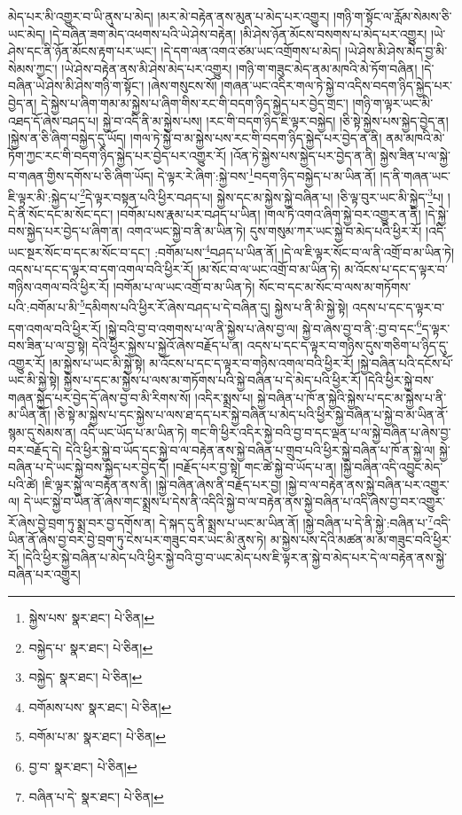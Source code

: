 མེད་པར་མི་འགྱུར་བ་ཡི་ནུས་པ་མེད། །མར་མེ་བརྟེན་ནས་མུན་པ་མེད་པར་འགྱུར། །གཉི་ག་སྟོང་ལ་རློམ་སེམས་ཅི་ཡང་མེད། །དེ་བཞིན་ཟག་མེད་འཕགས་པའི་ཡེ་ཤེས་བརྟེན། །མི་ཤེས་ཉོན་མོངས་བསགས་པ་མེད་པར་འགྱུར། །ཡེ་ཤེས་དང་ནི་ཉོན་མོངས་རྟག་པར་ཡང་། །དེ་དག་ལན་འགའ་ཙམ་ཡང་འགྲོགས་པ་མེད། །ཡེ་ཤེས་མི་ཤེས་མེད་བྱ་མི་སེམས་ཀྱང་། །ཡེ་ཤེས་བརྟེན་ནས་མི་ཤེས་མེད་པར་འགྱུར། །གཉི་ག་གཟུང་མེད་ནམ་མཁའི་མེ་ཏོག་བཞིན། །དེ་བཞིན་ཡེ་ཤེས་མི་ཤེས་གཉི་ག་སྟོང་། །ཞེས་གསུངས་སོ། །གཞན་ཡང་འདིར་གལ་ཏེ་སྐྱེ་བ་འདིས་བདག་ཉིད་སྐྱེད་པར་བྱེད་ན། དེ་སྐྱེས་པ་ཞིག་གམ་མ་སྐྱེས་པ་ཞིག་གིས་རང་གི་བདག་ཉིད་སྐྱེད་པར་བྱེད་གྲང་། །གཉི་ག་ལྟར་ཡང་མི་འཐད་དོ་ཞེས་བཤད་པ། སྐྱེ་བ་འདི་ནི་མ་སྐྱེས་པས། །རང་གི་བདག་ཉིད་ཇི་ལྟར་བསྐྱེད། །ཅི་སྟེ་སྐྱེས་པས་སྐྱེད་བྱེད་ན། །སྐྱེས་ན་ཅི་ཞིག་བསྐྱེད་དུ་ཡོད། །གལ་ཏེ་སྐྱེ་བ་མ་སྐྱེས་པས་རང་གི་བདག་ཉིད་སྐྱེད་པར་བྱེད་ན་ནི། ནམ་མཁའི་མེ་ཏོག་ཀྱང་རང་གི་བདག་ཉིད་སྐྱེད་པར་བྱེད་པར་འགྱུར་རོ། །འོན་ཏེ་སྐྱེས་པས་སྐྱེད་པར་བྱེད་ན་ནི། སྐྱེས་ཟིན་པ་ལ་སྐྱེ་བ་གཞན་གྱིས་དགོས་པ་ཅི་ཞིག་ཡོད། དེ་ལྟར་རེ་ཞིག་:སྐྱེ་བས་\footnote{སྐྱེས་པས་  སྣར་ཐང་།  པེ་ཅིན། }བདག་ཉིད་བསྐྱེད་པ་མ་ཡིན་ནོ། །ད་ནི་གཞན་ཡང་ཇི་ལྟར་མི་:སྐྱེད་པ་\footnote{བསྐྱེད་པ་  སྣར་ཐང་།  པེ་ཅིན། }དེ་ལྟར་བསྟན་པའི་ཕྱིར་བཤད་པ། སྐྱེས་དང་མ་སྐྱེས་སྐྱེ་བཞིན་པ། །ཅི་ལྟ་བུར་ཡང་མི་སྐྱེད་\footnote{བསྐྱེད་  སྣར་ཐང་།  པེ་ཅིན། }པ། །དེ་ནི་སོང་དང་མ་སོང་དང་། །བགོམ་པས་རྣམ་པར་བཤད་པ་ཡིན། །གལ་ཏེ་འགའ་ཞིག་སྐྱེ་བར་འགྱུར་ན་ནི། །དེ་སྐྱེ་བས་སྐྱེད་པར་བྱེད་པ་ཞིག་ན། འགའ་ཡང་སྐྱེ་བ་ནི་མ་ཡིན་ཏེ། དུས་གསུམ་ཀར་ཡང་སྐྱེ་བ་མེད་པའི་ཕྱིར་རོ། །འདི་ཡང་སྔར་སོང་བ་དང་མ་སོང་བ་དང་། :བགོམ་པས་\footnote{བགོམས་པས་  སྣར་ཐང་།  པེ་ཅིན། }བཤད་པ་ཡིན་ནོ། །དེ་ལ་ཇི་ལྟར་སོང་བ་ལ་ནི་འགྲོ་བ་མ་ཡིན་ཏེ། འདས་པ་དང་ད་ལྟར་བ་དག་འགལ་བའི་ཕྱིར་རོ། །མ་སོང་བ་ལ་ཡང་འགྲོ་བ་མ་ཡིན་ཏེ། མ་འོངས་པ་དང་ད་ལྟར་བ་གཉིས་འགལ་བའི་ཕྱིར་རོ། །བགོམ་པ་ལ་ཡང་འགྲོ་བ་མ་ཡིན་ཏེ། སོང་བ་དང་མ་སོང་བ་ལས་མ་གཏོགས་པའི་:བགོམ་པ་མི་\footnote{བགོམ་པ་མ་  སྣར་ཐང་།  པེ་ཅིན། }དམིགས་པའི་ཕྱིར་རོ་ཞེས་བཤད་པ་དེ་བཞིན་དུ། སྐྱེས་པ་ནི་མི་སྐྱེ་སྟེ། འདས་པ་དང་ད་ལྟར་བ་དག་འགལ་བའི་ཕྱིར་རོ། །སྐྱེ་བའི་བྱ་བ་འགགས་པ་ལ་ནི་སྐྱེས་པ་ཞེས་བྱ་ལ། སྐྱེ་བ་ཞེས་བྱ་བ་ནི་:བྱ་བ་དང་\footnote{བྱ་བ་  སྣར་ཐང་།  པེ་ཅིན། }ད་ལྟར་བས་ཟིན་པ་ལ་བྱ་སྟེ། དེའི་ཕྱིར་སྐྱེས་པ་སྐྱེའོ་ཞེས་བརྗོད་པ་ན། འདས་པ་དང་ད་ལྟར་བ་གཉིས་དུས་གཅིག་པ་ཉིད་དུ་འགྱུར་རོ། །མ་སྐྱེས་པ་ཡང་མི་སྐྱེ་སྟེ། མ་འོངས་པ་དང་ད་ལྟར་བ་གཉིས་འགལ་བའི་ཕྱིར་རོ། །སྐྱེ་བཞིན་པའི་དངོས་པོ་ཡང་མི་སྐྱེ་སྟེ། སྐྱེས་པ་དང་མ་སྐྱེས་པ་ལས་མ་གཏོགས་པའི་སྐྱེ་བཞིན་པ་དེ་མེད་པའི་ཕྱིར་རོ། །དེའི་ཕྱིར་སྐྱེ་བས་གཞན་སྐྱེད་པར་བྱེད་དོ་ཞེས་བྱ་བ་མི་རིགས་སོ། །འདིར་སྨྲས་པ། སྐྱེ་བཞིན་པ་ཁོ་ན་སྐྱེའི་སྐྱེས་པ་དང་མ་སྐྱེས་པ་ནི་མ་ཡིན་ནོ། །ཅི་སྟེ་མ་སྐྱེས་པ་དང་སྐྱེས་པ་ལས་ཐ་དད་པར་སྐྱེ་བཞིན་པ་མེད་པའི་ཕྱིར་སྐྱེ་བཞིན་པ་སྐྱེ་བ་མ་ཡིན་ནོ་སྙམ་དུ་སེམས་ན། འདི་ཡང་ཡོད་པ་མ་ཡིན་ཏེ། གང་གི་ཕྱིར་འདིར་སྐྱེ་བའི་བྱ་བ་དང་ལྡན་པ་ལ་སྐྱེ་བཞིན་པ་ཞེས་བྱ་བར་བརྗོད་དེ། དེའི་ཕྱིར་སྐྱེ་བ་ཡོད་དང་སྐྱེ་བ་ལ་བརྟེན་ནས་སྐྱེ་བཞིན་པ་གྲུབ་པའི་ཕྱིར་སྐྱེ་བཞིན་པ་ཁོ་ན་སྐྱེ་ལ། སྐྱེ་བཞིན་པ་དེ་ཡང་སྐྱེ་བས་སྐྱེད་པར་བྱེད་དོ། །བརྗོད་པར་བྱ་སྟེ། གང་ཚེ་སྐྱེ་བ་ཡོད་པ་ན། །སྐྱེ་བཞིན་འདི་འབྱུང་མེད་པའི་ཚེ། །ཇི་ལྟར་སྐྱེ་ལ་བརྟེན་ནས་ནི། །སྐྱེ་བཞིན་ཞེས་ནི་བརྗོད་པར་བྱ། །སྐྱེ་བ་ལ་བརྟེན་ནས་སྐྱེ་བཞིན་པར་འགྱུར་ལ། དེ་ཡང་སྐྱེ་བ་ཡིན་ནོ་ཞེས་གང་སྨྲས་པ་དེས་ནི་འདིའི་སྐྱེ་བ་ལ་བརྟེན་ནས་སྐྱེ་བཞིན་པ་འདི་ཞེས་བྱ་བར་འགྱུར་རོ་ཞེས་བྱེ་བྲག་ཏུ་སྨྲ་བར་བྱ་དགོས་ན། དེ་སྐད་དུ་ནི་སྨྲས་པ་ཡང་མ་ཡིན་ནོ། །སྐྱེ་བཞིན་པ་དེ་ནི་སྐྱེ་:བཞིན་པ་\footnote{བཞིན་པ་དེ་  སྣར་ཐང་།  པེ་ཅིན། }འདི་ཡིན་ནོ་ཞེས་བྱ་བར་བྱེ་བྲག་ཏུ་ངེས་པར་གཟུང་བར་ཡང་མི་ནུས་ཏེ། མ་སྐྱེས་པས་དེའི་མཚན་མ་མ་གཟུང་བའི་ཕྱིར་རོ། །དེའི་ཕྱིར་སྐྱེ་བཞིན་པ་མེད་པའི་ཕྱིར་སྐྱེ་བའི་བྱ་བ་ཡང་མེད་པས་ཇི་ལྟར་ན་སྐྱེ་བ་མེད་པར་དེ་ལ་བརྟེན་ནས་སྐྱེ་བཞིན་པར་འགྱུར། 